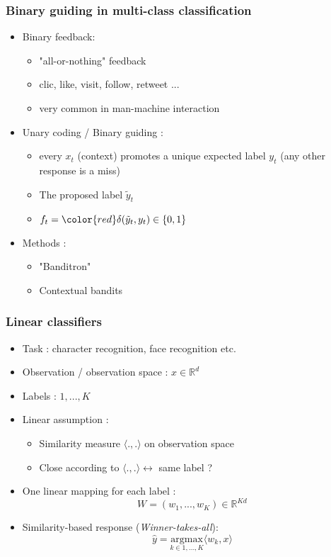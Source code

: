 \documentclass{beamer}
\begin{document}
\begin{frame}
	\frametitle{Binary guiding in multi-class classification}
	
	\begin{itemize}
		\item Binary feedback:
		\begin{itemize}
			\item "all-or-nothing" feedback
			\item clic, like, visit, follow, retweet ...
			\item very common in man-machine interaction
		\end{itemize}
		\item Unary coding / Binary guiding : 
		\begin{itemize}
			\item every $x_t$ (context) promotes a unique expected label $y_t$
			(any other response is a miss)
			\item The proposed label $\tilde{y}_t$
			\item $f_t = {\color{red}\delta(\tilde{y}_t ,y_t)} \in \{0,1\}$
		\end{itemize}
		\item Methods :
		\begin{itemize}
			\item "Banditron" \cite{kakade2008efficient}
			\item Contextual bandits
		\end{itemize}
	\end{itemize}
\end{frame}





\begin{frame}
	\frametitle{Linear classifiers}
	\begin{itemize}
		\item Task : character recognition, face recognition etc.
		\item Observation / observation space : $x \in \mathbb{R}^d $ 
		\item Labels : $1,...,K$
		\item Linear assumption : 
		\begin{itemize}
			\item Similarity measure $\langle .,. \rangle$ on observation space
			\item Close according to $\langle .,. \rangle \leftrightarrow$ same label ?
		\end{itemize}
		\item One linear mapping for each label :
		$$ W = (w_1, ..., w_K) \in \mathbb{R}^{Kd}$$
		\item Similarity-based response (\textit{Winner-takes-all}):
		$$ \hat{y} = \underset{k \in 1,...,K}{\text{argmax}}\langle w_k,x\rangle$$
	\end{itemize}
\end{frame}
\end{document}

